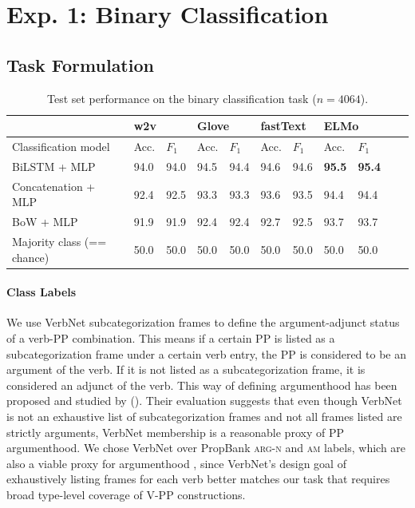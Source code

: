 \documentclass[letterpaper]{article} %
\begin{document}
\section{Exp. 1: Binary Classification}

\subsection{Task Formulation}
\label{ex1:data}

\begin{table}[h]
\centering
\begin{tabular}{@{}lllllllllll@{}}
\toprule
& \multicolumn{2}{l}{w2v} &\multicolumn{2}{l}{Glove}& \multicolumn{2}{l}{fastText} & \multicolumn{2}{l}{ELMo} \\ \midrule
Classification model       & Acc. & $F_1$ & Acc. & $F_1$ & Acc. & $F_1$ & Acc. & $F_1$   \\ \midrule
BiLSTM + MLP &   94.0  &  94.0 \hspace{0.8cm} &  94.5 & 94.4 \hspace{0.8cm} & 94.6 & 94.6 \hspace{0.8cm} & \textbf{95.5}& \textbf{95.4} \\
Concatenation + MLP & 92.4 & 92.5 & 93.3& 93.3& 93.6 & 93.5 & 94.4 & 94.4\\
BoW + MLP & 91.9& 91.9 & 92.4 &92.4 & 92.7& 92.5& 93.7 & 93.7\\
Majority class (== chance)       & 50.0      & 50.0 &  50.0 & 50.0  & 50.0 &50.0 & 50.0 & 50.0\\
\bottomrule
\end{tabular}
\caption{Test set performance on the binary classification task  ($n=4064$).}
\label{ex1:accuracy}
\end{table}

\paragraph{Class Labels} We use VerbNet subcategorization frames to define the argument-adjunct status of a verb-PP combination. This means if a certain PP is listed as a subcategorization frame under a certain verb entry, the PP is considered to be an argument of the verb. If it is not listed as a subcategorization frame, it is considered an adjunct of the verb. This way of defining argumenthood has been proposed and studied by \citeauthor{mcconville2008evaluating} (\citeyear{mcconville2008evaluating}). Their evaluation suggests that even though VerbNet is not an exhaustive list of subcategorization frames and not all frames listed are strictly arguments, VerbNet membership is a reasonable proxy of PP argumenthood. We chose VerbNet over PropBank \textsc{arg-n} and \textsc{am} labels, which are also a viable proxy for argumenthood \cite{abend2010fully}, since VerbNet's design goal of exhaustively listing frames for each verb better matches our task that requires broad type-level coverage of V-PP constructions. %
\end{document}
